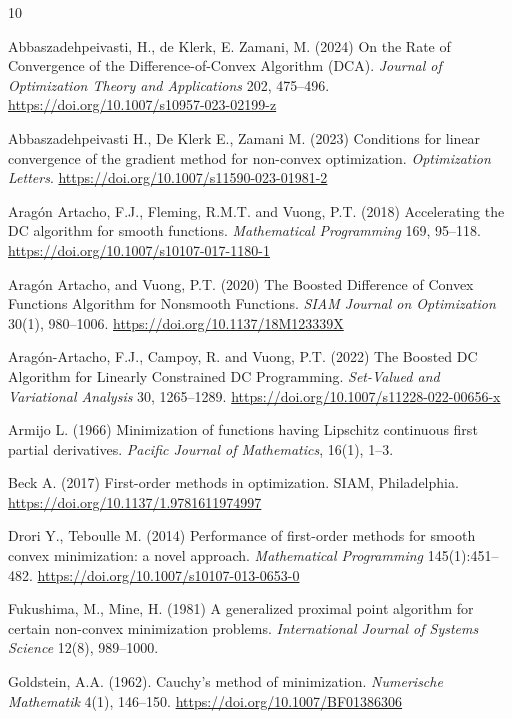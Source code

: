 \documentclass{article} %
\begin{document}
	 \begin{thebibliography}{10}

	 Abbaszadehpeivasti, H., de Klerk, E. Zamani, M. (2024) On the Rate of Convergence of the Difference-of-Convex
Algorithm (DCA). \textit{Journal of Optimization Theory and Applications} 202, 475--496.
\url{https://doi.org/10.1007/s10957-023-02199-z}

 Abbaszadehpeivasti H., De Klerk E., Zamani M. (2023) Conditions
 for linear convergence of the gradient method for non-convex optimization. \textit{Optimization Letters}. \url{https://doi.org/10.1007/s11590-023-01981-2}

Arag\'on Artacho, F.J., Fleming, R.M.T. and Vuong, P.T.  (2018) Accelerating the DC algorithm for smooth functions. \textit{Mathematical Programming} 169, 95--118. \url{https://doi.org/10.1007/s10107-017-1180-1}

Arag\'on Artacho, and Vuong, P.T. (2020)
The Boosted Difference of Convex Functions Algorithm for Nonsmooth Functions.
\textit{SIAM Journal on Optimization}
30(1), 980--1006. \url{https://doi.org/10.1137/18M123339X}

Arag\'on-Artacho, F.J., Campoy, R. and Vuong, P.T. (2022) The Boosted DC Algorithm for Linearly Constrained
DC Programming. \textit{Set-Valued and Variational Analysis} 30, 1265--1289. \url{https://doi.org/10.1007/s11228-022-00656-x}

{
Armijo L. (1966)
Minimization of functions having Lipschitz continuous first partial derivatives.
\textit{Pacific Journal of Mathematics},
16(1), 1--3.
}



 Beck A. (2017) First-order methods in optimization. {S}{I}{A}{M}, Philadelphia. \url{ https://doi.org/10.1137/1.9781611974997}

 Drori Y., Teboulle M. (2014) Performance of first-order
methods for smooth convex minimization: a novel approach. \textit{Mathematical Programming} 145(1):451--482. \url{https://doi.org/10.1007/s10107-013-0653-0}

		
Fukushima, M., Mine, H. (1981) A generalized proximal point algorithm for certain non-convex minimization
problems. \textit{International Journal of Systems Science} 12(8), 989--1000.

{
Goldstein, A.A. (1962).
Cauchy's method of minimization.
\textit{Numerische Mathematik} 4(1), 146--150.
\url{https://doi.org/10.1007/BF01386306}
}


\end{thebibliography}
\end{document}
